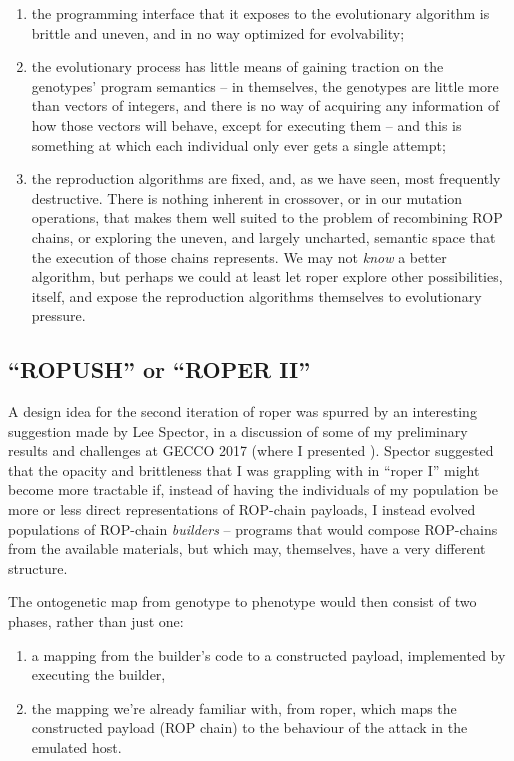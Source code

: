 \documentclass[12pt,glossary]{dalthesis}
\begin{document}
\begin{enumerate}
\item the programming interface that it exposes to the evolutionary
algorithm is brittle and uneven, and in no way optimized for evolvability;

\item the evolutionary process has little means of gaining traction
on the genotypes' program semantics -- in themselves, the genotypes are
little more than vectors of integers, and there is no way of acquiring any
information of how those vectors will behave, except for executing them --
and this is something at which each individual only ever gets a single
attempt;

\item the reproduction algorithms are fixed, and, as we have seen,
most frequently destructive. There is nothing inherent in crossover, or in
our mutation operations, that makes them well suited to the problem of
recombining ROP chains, or exploring the uneven, and largely uncharted,
semantic space that the execution of those chains represents. We may not
\emph{know} a better algorithm, but perhaps we could at least let \gls{roper}
explore other possibilities, itself, and expose the reproduction algorithms
themselves to evolutionary pressure.
\end{enumerate}

\subsection{``ROPUSH'' or ``ROPER II''}
\label{sec:orgd5ab9f6}

A design idea for the second iteration of \gls{roper} was spurred by an
interesting suggestion made by Lee Spector, in a discussion of some of my
preliminary results and challenges at GECCO 2017 (where I presented \cite{fraser17_gecco}). Spector suggested that the
opacity and brittleness that I was grappling with in ``\gls{roper} I'' might become
more tractable if, instead of having the individuals of my population be more or
less direct representations of ROP-chain payloads, I instead evolved populations
of ROP-chain \emph{builders} -- programs that would compose ROP-chains from the
available materials, but which may, themselves, have a very different structure.

The ontogenetic map from genotype to phenotype would then consist of two phases,
rather than just one:

\begin{enumerate}
\item a mapping from the builder's code to a constructed payload, implemented
by executing the builder,

\item the mapping we're already familiar with, from \gls{roper}, which maps the
constructed payload (ROP chain) to the behaviour of the attack in the
emulated host.
\end{enumerate}
\end{document}
